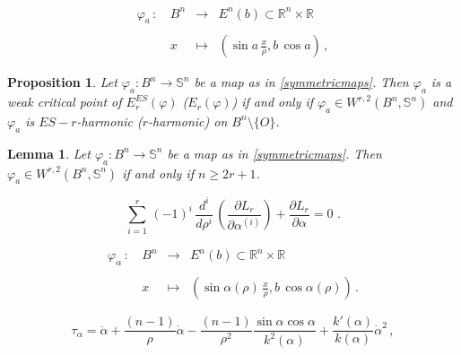 \documentclass[10pt,a4paper]{amsart}
\newtheorem{proposition}{Proposition}
\newtheorem{lemma}{Lemma}
\def \R{{\mathbb R}}
\def \s{{\mathbb S}}
\begin{document}
\begin{equation}\label{symmetricmaps-ellipsoid}\begin{array}{lcll}
                                           \varphi_{a} \,:\, &B^n &\to &  E^n(b) \subset \R^n \times \R \\
                                           &&& \\
                                           &x &\mapsto & ( \sin a\,{\frac{x}{\rho}}, b\,\cos a) \, ,
                                         \end{array}
\end{equation}

\begin{proposition}\label{pro:weakly-criterium} Let
$\varphi_a:B^n \to \s^n$ be a map as in \eqref{symmetricmaps}. Then $\varphi_a$ is a weak critical point of $E^{ES}_r(\varphi)$ ($E_r(\varphi)$) if and only if  $\varphi_a \in W^{r,2}\left ( B^n,\s^n \right )$ and $\varphi_a$ is $ES-r$-harmonic ($r$-harmonic) on $B^n \setminus \{ O\}$.
\end{proposition}

\begin{lemma}\label{lemma-belong-Sobolev-space}
Let
$\varphi_a:B^n \to \s^n$ be a map as in \eqref{symmetricmaps}. Then $\varphi_a \in W^{r,2}\left ( B^n,\s^n \right )$ if and only if $n\geq 2r+1$.
\end{lemma}

\begin{equation}\label{Euler-lagrange-generale}
\sum_{i=1}^r \, (-1)^i \, \frac{d^i}{d\rho^i}\,\left( \frac{\partial L_r}{\partial \alpha^{(i)}}\right)+\frac{\partial L_r}{\partial \alpha}=0 \,\,.
\end{equation}

\begin{equation}\label{symmetricmaps-ellipsoid-general}\begin{array}{lcll}
                                           \varphi_{\alpha} \,:\, &B^n &\to &  E^n(b) \subset \R^n \times \R \\
                                           &&& \\
                                           &x &\mapsto & ( \sin \alpha(\rho)\,\frac{x}{\rho}, b\,\cos \alpha(\rho)) \, .
                                         \end{array}
\end{equation}

\begin{equation}\label{eq-tau-Enb}
\tau_\alpha= \ddot{\alpha}+\frac{(n-1)}{\rho}\dot \alpha-\frac{(n-1)}{\rho^2} \frac{\sin \alpha \cos \alpha}{k^2(\alpha)}+\frac{k'(\alpha)}{k(\alpha)} \dot{\alpha}^2 \,,
\end{equation}
\end{document}
